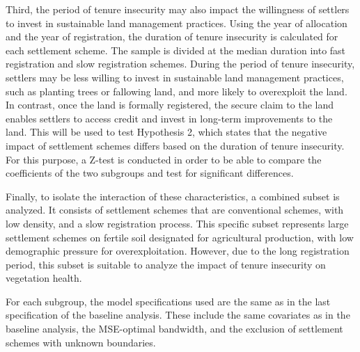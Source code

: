 Third, the period of tenure insecurity may also impact the willingness of settlers to invest in sustainable land management practices.
Using the year of allocation and the year of registration, the duration of tenure insecurity is calculated for each settlement scheme.
The sample is divided at the median duration into fast registration and slow registration schemes.
During the period of tenure insecurity, settlers may be less willing to invest in sustainable land management practices, such as planting trees or fallowing land, and more likely to overexploit the land.
In contrast, once the land is formally registered, the secure claim to the land enables settlers to access credit and invest in long-term improvements to the land.
This will be used to test Hypothesis 2, which states that the negative impact of settlement schemes differs based on the duration of tenure insecurity.
For this purpose, a Z-test is conducted in order to be able to compare the coefficients of the two subgroups and test for significant differences.

Finally, to isolate the interaction of these characteristics, a combined subset is analyzed.
It consists of settlement schemes that are conventional schemes, with low density, and a slow registration process.
This specific subset represents large settlement schemes on fertile soil designated for agricultural production, with low demographic pressure for overexploitation.
However, due to the long registration period, this subset is suitable to analyze the impact of tenure insecurity on vegetation health.

For each subgroup, the model specifications used are the same as in the last specification of the baseline analysis.
These include the same covariates as in the baseline analysis, the MSE-optimal bandwidth, and the exclusion of settlement schemes with unknown boundaries.